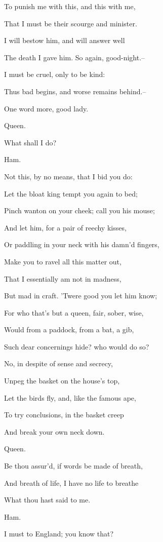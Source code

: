 \documentclass[12pt]{book}
\begin{document}
To punish me with this, and this with me,

That I must be their scourge and minister.

I will bestow him, and will answer well

The death I gave him. So again, good-night.--

I must be cruel, only to be kind:

Thus bad begins, and worse remains behind.--

One word more, good lady.



Queen.

What shall I do?



Ham.

Not this, by no means, that I bid you do:

Let the bloat king tempt you again to bed;

Pinch wanton on your cheek; call you his mouse;

And let him, for a pair of reechy kisses,

Or paddling in your neck with his damn'd fingers,

Make you to ravel all this matter out,

That I essentially am not in madness,

But mad in craft. 'Twere good you let him know;

For who that's but a queen, fair, sober, wise,

Would from a paddock, from a bat, a gib,

Such dear concernings hide? who would do so?

No, in despite of sense and secrecy,

Unpeg the basket on the house's top,

Let the birds fly, and, like the famous ape,

To try conclusions, in the basket creep

And break your own neck down.



Queen.

Be thou assur'd, if words be made of breath,

And breath of life, I have no life to breathe

What thou hast said to me.



Ham.

I must to England; you know that?
\end{document}
